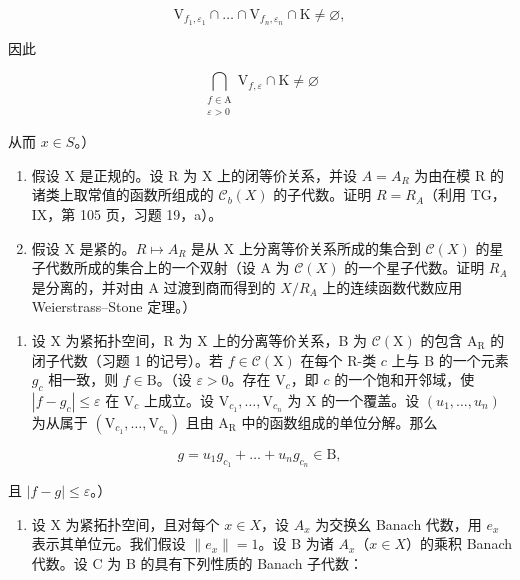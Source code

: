 \[
\mathrm{V} _ {f _ {1}, \varepsilon_ {1}} \cap \dots \cap \mathrm{V} _ {f _ {n}, \varepsilon_ {n}} \cap \mathrm{K} \neq \varnothing ,
\]

因此

\[
\bigcap_{\substack{f\in \mathrm{A}\\ \varepsilon >0}}\mathrm{V}_{f,\varepsilon}\cap \mathrm{K}\neq \varnothing
\]

从而 \(x \in S\)。）

\begin{enumerate}
\def\labelenumi{\alph{enumi})}
\setcounter{enumi}{1}
\item
  假设 X 是正规的。设 R 为 X 上的闭等价关系，并设 \(A = A_{R}\) 为由在模 R 的诸类上取常值的函数所组成的 \(\mathcal{C}_{b}(X)\) 的子代数。证明 \(R = R_{A}\)（利用 TG，IX，第 105 页，习题 19，a）。
\item
  假设 X 是紧的。\(R \mapsto A_{R}\) 是从 X 上分离等价关系所成的集合到 \(\mathcal{C}(X)\) 的星子代数所成的集合上的一个双射（设 A 为 \(\mathcal{C}(X)\) 的一个星子代数。证明 \(R_{A}\) 是分离的，并对由 A 过渡到商而得到的 \(X/R_{A}\) 上的连续函数代数应用 Weierstrass–Stone 定理。）
\end{enumerate}

\begin{enumerate}
\def\labelenumi{\arabic{enumi})}
\setcounter{enumi}{1}
\tightlist
\item
  设 X 为紧拓扑空间，R 为 X 上的分离等价关系，B 为 \(\mathcal{C}(\mathrm{X})\) 的包含 \(\mathrm{A}_{\mathrm{R}}\) 的闭子代数（习题 1 的记号）。若 \(f \in \mathcal{C}(\mathrm{X})\) 在每个 R-类 \(c\) 上与 B 的一个元素 \(g_{c}\) 相一致，则 \(f \in \mathrm{B}\)。（设 \(\varepsilon > 0\)。存在 \(\mathrm{V}_{c}\)，即 \(c\) 的一个饱和开邻域，使 \(|f - g_{c}| \leqslant \varepsilon\) 在 \(\mathrm{V}_{c}\) 上成立。设 \(\mathrm{V}_{c_{1}}, \ldots, \mathrm{V}_{c_{n}}\) 为 X 的一个覆盖。设 \((u_{1}, \ldots, u_{n})\) 为从属于 \((\mathrm{V}_{c_{1}}, \ldots, \mathrm{V}_{c_{n}})\) 且由 \(\mathrm{A}_{\mathrm{R}}\) 中的函数组成的单位分解。那么
\end{enumerate}

\[
g = u _ {1} g _ {c _ {1}} + \dots + u _ {n} g _ {c _ {n}} \in \mathrm{B},
\]

且 \(|f - g| \leqslant \varepsilon\)。）

\begin{enumerate}
\def\labelenumi{\arabic{enumi})}
\setcounter{enumi}{2}
\tightlist
\item
  设 X 为紧拓扑空间，且对每个 \(x \in X\)，设 \(A_{x}\) 为交换幺 Banach 代数，用 \(e_{x}\) 表示其单位元。我们假设 \(\|e_{x}\| = 1\)。设 B 为诸 \(A_{x}\)（\(x \in X\)）的乘积 Banach 代数。设 C 为 B 的具有下列性质的 Banach 子代数：
\end{enumerate}

